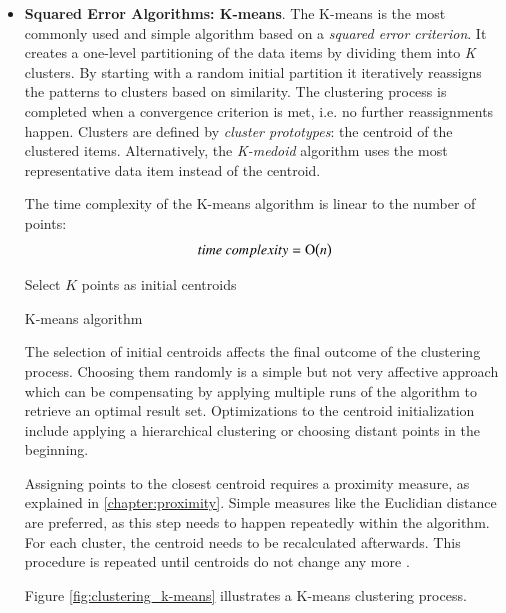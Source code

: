 \begin{itemize}

\item \textbf{Squared Error Algorithms: K-means}. The K-means is the most commonly used and simple algorithm based on a \textit{squared error criterion}. It creates a one-level partitioning of the data items by dividing them into \textit{K} clusters. By starting with a random initial partition it iteratively reassigns the patterns to clusters based on similarity.  The clustering process is completed when a convergence criterion is met, i.e. no further reassignments happen. Clusters are defined by \textit{cluster prototypes}: the centroid of the clustered items. Alternatively, the \textit{K-medoid} algorithm uses the most representative data item instead of the centroid.

The time complexity of the K-means algorithm is linear to the number of points:
\[time~complexity = \operatorname{O}\bigl(n\bigr)\]

\begin{algorithm}[t]
  \BlankLine
  {Select $K$ points as initial centroids}\;
  \caption{K-means algorithm~\cite{Meert06clustermaps}}
  \label{alg:k-means}
\end{algorithm}

The selection of initial centroids affects the final outcome of the clustering process. Choosing them randomly is a simple but not very affective approach which can be compensating by applying multiple runs of the algorithm to retrieve an optimal result set. Optimizations to the centroid initialization include applying a hierarchical clustering or choosing distant points in the beginning.

Assigning points to the closest centroid requires a proximity measure, as explained in \ref{chapter:proximity}. Simple measures like the Euclidian distance are preferred, as this step needs to happen repeatedly within the algorithm. For each cluster, the centroid needs to be recalculated afterwards. This procedure is repeated until centroids do not change any more \cite{Jain99clusterreview, Meert06clustermaps}.

Figure \ref{fig:clustering_k-means} illustrates a K-means clustering process.


\end{itemize}
